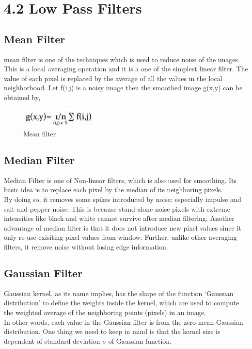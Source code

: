 \documentclass[12pt,fleqn]{article}
\begin{document}
\section{4.2 Low Pass Filters}
\subsection{Mean Filter}
mean filter is one of the techniques which is used to reduce noise of the images.\\
This is a local averaging operation and it is a one of the simplest linear filter. The value of each pixel is replaced by the average of all the values in the local neighborhood. Let f(i,j) is a noisy image then the smoothed image g(x,y) can be obtained by,
\begin{figure}[H]
	\centering
	\includegraphics[width=0.35\textwidth]{meanfilterformula.png}
	\caption{Mean filter}
	\label{fig:2.3.3}
\end{figure}
\subsection{Median Filter}
Median Filter is one of Non-linear filters, which is also used for smoothing. Its basic idea is to replace each pixel by the median of its neighboring pixels.\\
By doing so, it removes some spikes introduced by noise: especially impulse and salt and pepper noise. This is because stand-alone noise pixels with extreme intensities like black and white cannot survive after median filtering. Another advantage of median filter is that it does not introduce new pixel values since it only re-use exisiting pixel values from window. Further, unlike other averaging filters, it remove noise without losing edge information.
\subsection{Gaussian Filter}
Gaussian kernel, as its name implies, has the shape of the function ‘Gaussian distribution’ to define the weights inside the kernel, which are used to compute the weighted average of the neighboring points (pixels) in an image.\\
In other words, each value in the Gaussian filter is from the zero mean Gaussian distribution. One thing we need to keep in mind is that the kernel size is dependent of standard deviation $\sigma$ of Gaussian function.
\end{document}
